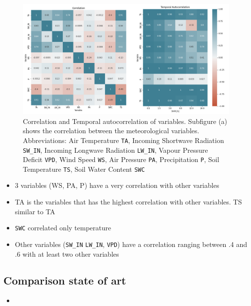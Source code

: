 \documentclass{article}
\newcommand{\imgwidth}{6in}
\let\Oldsubsection\subsection
\renewcommand{\subsection}{\FloatBarrier\Oldsubsection}
\begin{document}
\begin{figure}
    \centering
    \includegraphics[width=\imgwidth]{correlation}
    \caption{Correlation and Temporal autocorrelation of variables. Subfigure (a) shows the correlation between the meteorological variables. Abbreviations: Air Temperature \texttt{TA}, Incoming Shortwave Radiation \texttt{SW\_IN}, Incoming Longwave Radiation \texttt{LW\_IN}, Vapour Pressure Deficit \texttt{VPD}, Wind Speed \texttt{WS}, Air Pressure \texttt{PA}, Precipitation \texttt{P}, Soil Temperature \texttt{TS}, Soil Water Content \texttt{SWC}}
    \label{fig:correlation}
\end{figure}

\begin{itemize}
    \item 3 variables (WS, PA, P) have a very correlation with other variables
    \item TA is the variables that has the highest correlation with other variables. TS similar to TA
    \item \texttt{SWC} correlated only temperature
    \item Other variables (\texttt{SW\_IN} \texttt{LW\_IN}, \texttt{VPD}) have a correlation ranging between .4 and .6 with at least two other variables
\end{itemize}



\subsection{Comparison state of art}

\begin{itemize}
    \item 
\end{itemize}
\end{document}
